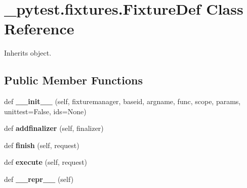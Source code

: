 \hypertarget{class__pytest_1_1fixtures_1_1_fixture_def}{}\section{\+\_\+pytest.\+fixtures.\+Fixture\+Def Class Reference}
\label{class__pytest_1_1fixtures_1_1_fixture_def}


Inherits object.

\subsection*{Public Member Functions}
\begin{DoxyCompactItemize}
\item 
\mbox{\label{class__pytest_1_1fixtures_1_1_fixture_def_a3f9c02b83914094b83a02ac44afd7797}} 
def {\bfseries \+\_\+\+\_\+init\+\_\+\+\_\+} (self, fixturemanager, baseid, argname, func, scope, params, unittest=False, ids=None)
\item 
\mbox{\label{class__pytest_1_1fixtures_1_1_fixture_def_ad13e481048335ef4b1c3cb646303d27b}} 
def {\bfseries addfinalizer} (self, finalizer)
\item 
\mbox{\label{class__pytest_1_1fixtures_1_1_fixture_def_a3f7da393fa479576a157b58d9257558e}} 
def {\bfseries finish} (self, request)
\item 
\mbox{\label{class__pytest_1_1fixtures_1_1_fixture_def_ad12a46d963cf7d059cc00020294f309f}} 
def {\bfseries execute} (self, request)
\item 
\mbox{\label{class__pytest_1_1fixtures_1_1_fixture_def_a63382528d00e30a0f1ac07d1aacf7dbd}} 
def {\bfseries \+\_\+\+\_\+repr\+\_\+\+\_\+} (self)
\end{DoxyCompactItemize}
